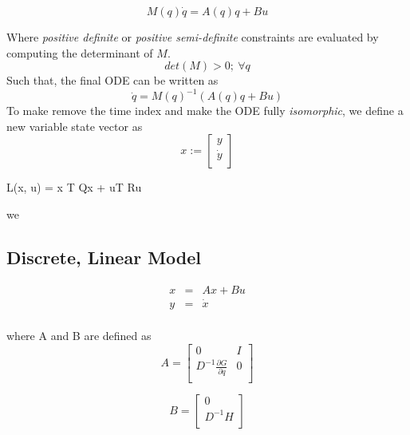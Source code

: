 \documentclass[journal]{IEEEtran}
\begin{document}
\begin{equation}
M(q)\dot{q} = A(q)q + Bu
\end{equation}

Where \emph{positive definite} or \emph{positive semi-definite} constraints are
evaluated by computing the determinant of \(M\).
\begin{equation}
det(M) > 0;~ \forall q
\end{equation}
Such that, the final ODE can be written as
\begin{equation}
    \dot{q} = M(q)^{-1}(A(q)q + Bu)
\end{equation}
To make remove the time index and make the ODE fully \emph{isomorphic}, we
define a new variable state vector as
\begin{equation}
    x:=
    \begin{bmatrix}
        y \\
        \dot{y}\\
    \end{bmatrix}
\end{equation}

L(x, u) =
 x T
 Qx + uT Ru


we
\subsection{Discrete, Linear Model}
\begin{equation}
\begin{array}{rcl}
    x &=& Ax + Bu \\
    y &=& \dot{x} \\
\end{array}
\end{equation}

where A and B are defined as
\begin{equation}
    A =
\begin{bmatrix}
        0 & I \\
        D^{-1} \frac{\partial G}{\partial q} & 0 \\
\end{bmatrix}
\end{equation}

\begin{equation}
    B =
\begin{bmatrix}
    0 \\
    D^{-1} H\\
    \end{bmatrix}
    \end{equation}
\end{document}
